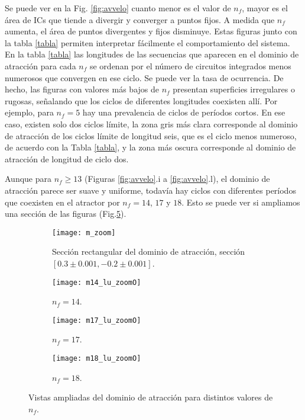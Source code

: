 Se puede ver en la Fig. \ref{fig:avvelo} cuanto menor es el valor de $n_f$, mayor es el área de ICs que tiende a divergir y converger a puntos fijos.
A medida que $n_f$ aumenta, el área de puntos divergentes y fijos disminuye.
Estas figuras junto con la tabla \ref{tabla} permiten interpretar fácilmente el comportamiento del sistema.
En la tabla \ref{tabla} las longitudes de las secuencias que aparecen en el dominio de atracción para cada $n_f$ se ordenan por el número de circuitos integrados menos numerosos que convergen en ese ciclo.
Se puede ver la tasa de ocurrencia.
De hecho, las figuras con valores más bajos de $n_f$ presentan superficies irregulares o rugosas, señalando que los ciclos de diferentes longitudes coexisten allí.
Por ejemplo, para $n_f = 5$ hay una prevalencia de ciclos de períodos cortos.
En ese caso, existen solo dos ciclos límite, la zona gris más clara corresponde al dominio de atracción de los ciclos límite de longitud seis, que es el ciclo menos numeroso, de acuerdo con la Tabla \ref{tabla}, y la zona más oscura corresponde al dominio de atracción de longitud de ciclo dos.

Aunque para $n_f \geqslant 13$ (Figuras \ref{fig:avvelo}.i a \ref{fig:avvelo}.l), el dominio de atracción parece ser suave y uniforme, todavía hay ciclos con diferentes períodos que coexisten en el atractor por $ n_f = 14 $, $ 17 $ y $ 18 $.
Esto se puede ver si ampliamos una sección de las figuras (Fig.\ref{fig:m_zoom}).
%
\begin{figure}
    \centering
    \begin{subfigure}[t]{0.49\textwidth}
        \texttt{[image: m\_zoom]}
        \caption{Sección rectangular del dominio de atracción, sección $[0.3\pm 0.001, -0.2\pm 0.001]$.}
        \label{fig:gull}
    \end{subfigure}
    \hfill 
    \begin{subfigure}[t]{0.49\textwidth}
        \texttt{[image: m14\_lu\_zoomO]}
        \caption{$n_f=14$.}
        \label{fig:tiger}
    \end{subfigure}
   \hfill  
    \begin{subfigure}[t]{0.49\textwidth}
        \texttt{[image: m17\_lu\_zoomO]}
        \caption{$n_f=17$.}
        \label{fig:mouse}
    \end{subfigure}
  \hfill   
    \begin{subfigure}[t]{0.49\textwidth}
        \texttt{[image: m18\_lu\_zoomO]}
        \caption{$n_f=18$.}
        \label{fig:mouse}
    \end{subfigure}
    \caption{Vistas ampliadas del dominio de atracción para distintos valores de $n_f$.}\label{fig:m_zoom}
\end{figure}

